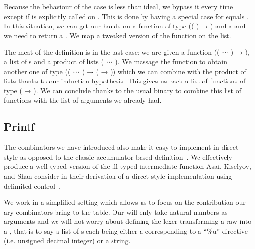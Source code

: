 {Because the behaviour of the  case is less than ideal, we bypass it
every time except if  is explicitly called on . This is
done by having a special case for  equals . In this situation,
we can get our hands on a function  of type
{((  ) → )} and a { } and we need to
return a { }. We map a tweaked version of the function on the list.


The meat of the definition is in the last case: we are given a function
{((    ⋯  ) → )}, a list of s
and a product of lists {(   ⋯   )}.
We massage the function to obtain another one of type
{((  ⋯  ) → ( → ))} which we can
combine with the product of lists thanks to our induction hypothesis. This gives
us back a list of functions of type {( → )}. We can conclude thanks
to the usual binary  to combine this list of functions with the list
of arguments we already had.


\subsection{Printf}\label{sec:printf}

The combinators we have introduced also make it easy to implement 
in direct style as opposed to the classic accumulator-based
definition~\cite{DBLP:conf/icfp/Augustsson98,DBLP:journals/jfp/Danvy98}. We
effectively produce a well typed version of the ill typed intermediate
function Asai, Kiselyov, and Shan consider in their derivation of a direct-style
implementation using delimited control~\cite{DBLP:journals/lisp/AsaiKS11}.

We work in a simplified setting which allows us to focus on the contribution our
-ary combinators bring to the table. Our  will only take natural
numbers as arguments and we will not worry about defining the lexer transforming
a raw  into a , that is to say a list of s each
being either a  corresponding to a ``\%u'' directive (i.e. unsigned
decimal integer) or a  string.

\begin{minipage}[t]{0.25\textwidth}
\end{minipage}\begin{minipage}[t]{0.2\textwidth}
\end{minipage}

}
